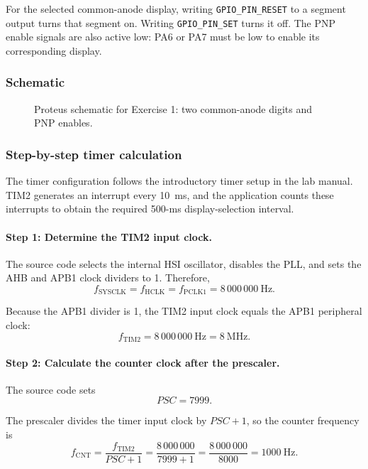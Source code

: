 \documentclass[a4paper]{article}
\begin{document}
For the selected common-anode display, writing
\texttt{GPIO\_PIN\_RESET} to a segment output turns that
segment on. Writing \texttt{GPIO\_PIN\_SET} turns it off.
The PNP enable signals are also active low: PA6 or PA7
must be low to enable its corresponding display.

\subsubsection{Schematic}

\begin{figure}[H]
    \centering
    \caption{Proteus schematic for Exercise 1: two common-anode digits and PNP enables.}
    \label{fig:ex01}
\end{figure}

\subsubsection{Step-by-step timer calculation}

The timer configuration follows the introductory timer
setup in the lab manual. TIM2 generates an interrupt every
10~ms, and the application counts these interrupts to obtain
the required 500-ms display-selection interval.

\paragraph{Step 1: Determine the TIM2 input clock.}

The source code selects the internal HSI oscillator,
disables the PLL, and sets the AHB and APB1 clock dividers
to 1. Therefore,
\[
    f_{\mathrm{SYSCLK}}
    = f_{\mathrm{HCLK}}
    = f_{\mathrm{PCLK1}}
    = 8\,000\,000~\mathrm{Hz}.
\]

Because the APB1 divider is 1, the TIM2 input clock equals
the APB1 peripheral clock:
\[
    f_{\mathrm{TIM2}}
    = 8\,000\,000~\mathrm{Hz}
    = 8~\mathrm{MHz}.
\]

\paragraph{Step 2: Calculate the counter clock after the prescaler.}

The source code sets
\[
    PSC = 7999.
\]

The prescaler divides the timer input clock by
$PSC+1$, so the counter frequency is
\[
    f_{\mathrm{CNT}}
    = \frac{f_{\mathrm{TIM2}}}{PSC+1}
    = \frac{8\,000\,000}{7999+1}
    = \frac{8\,000\,000}{8000}
    = 1000~\mathrm{Hz}.
\]
\end{document}
